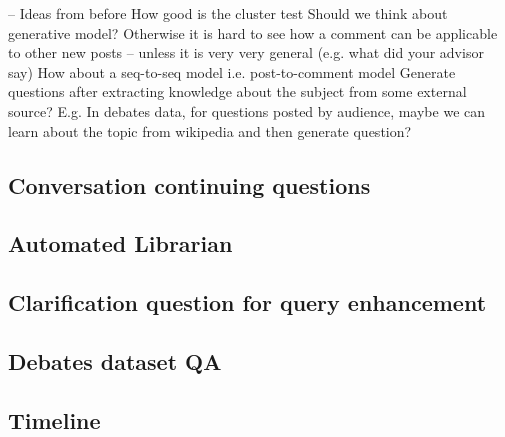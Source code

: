 \documentclass[11pt]{article}
\begin{document}
-- Ideas from before
How good is the cluster test
Should we think about generative model? Otherwise it is hard to see how a comment can be applicable to other new posts -- unless it is very very general (e.g. what did your advisor say) 
How about a seq-to-seq model i.e. post-to-comment model
Generate questions after extracting knowledge about the subject from some external source? E.g. In debates data, for questions posted by audience, maybe we can learn about the topic from wikipedia and then generate question?


\subsection{Conversation continuing questions}

\subsection{Automated Librarian}

\subsection{Clarification question for query enhancement}

\subsection{Debates dataset QA}

\fi

\subsection{Timeline}

\section{}
\end{document}
